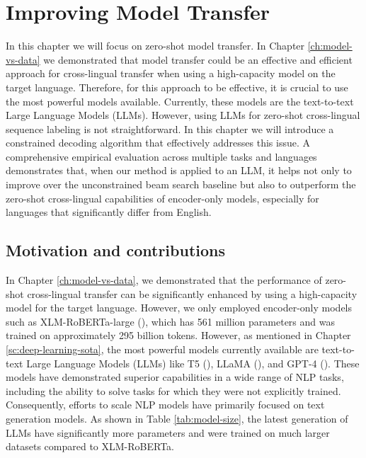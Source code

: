 \chapter[Improving Model Transfer]{Improving Model Transfer}
\label{ch:model-transfer}

In this chapter we will focus on zero-shot model transfer. In Chapter \ref{ch:model-vs-data} we demonstrated that model transfer could be an effective and efficient approach for cross-lingual transfer when using a high-capacity model on the target language. Therefore, for this approach to be effective, it is crucial to use the most powerful models available. Currently, these models are the text-to-text Large Language Models (LLMs). However, using LLMs for zero-shot cross-lingual sequence labeling is not straightforward. In this chapter we will introduce a constrained decoding algorithm that effectively addresses this issue. A comprehensive empirical evaluation across multiple tasks and languages demonstrates that, when our method is applied to an LLM, it helps not only to improve over the unconstrained beam search baseline but also to outperform the zero-shot cross-lingual capabilities of encoder-only models, especially for languages that significantly differ from English.

\section{Motivation and contributions}
\label{sc6:intro}

In Chapter \ref{ch:model-vs-data}, we demonstrated that the performance of zero-shot cross-lingual transfer can be significantly enhanced by using a high-capacity model for the target language. However, we only employed encoder-only models such as XLM-RoBERTa-large (\cite{conneau-etal-2020-unsupervised}), which has 561 million parameters and was trained on approximately 295 billion tokens. However, as mentioned in Chapter \ref{sc:deep-learning-sota}, the most powerful models currently available are text-to-text Large Language Models (LLMs) like T5 (\cite{DBLP:journals/jmlr/RaffelSRLNMZLL20-T5}), LLaMA (\cite{llama3modelcard}), and GPT-4 (\cite{openai2024gpt4technicalreport}). These models have demonstrated superior capabilities in a wide range of NLP tasks, including the ability to solve tasks for which they were not explicitly trained. Consequently, efforts to scale NLP models have primarily focused on text generation models. As shown in Table \ref{tab:model-size}, the latest generation of LLMs have significantly more parameters and were trained on much larger datasets compared to XLM-RoBERTa.


